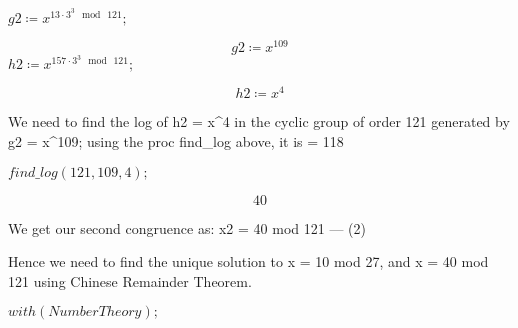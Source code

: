 \documentclass[11pt,a4paper,fleqn]{article}
\begin{document}
\begin{enumerate}[1.]
\begin{flushleft}
\begin{enumerate}
\begin{mdframed}
\begin{Maple Normal}
					\end{Maple Normal}
					\mapleinput
					{$ \displaystyle \mathit{g2} \coloneqq x^{13\cdot 3^{3}\mod \,121}; $}
					
					\begin{dmath}\label{(6)}
						\mathit{g2} \coloneqq x^{109}
					\end{dmath}
					\mapleinput
					{$ \displaystyle \mathit{h2} \coloneqq x^{157\cdot 3^{3}\mod \,121}; $}
					
					\begin{dmath}\label{(7)}
						\mathit{h2} \coloneqq x^{4}
					\end{dmath}
					\begin{Maple Normal}
						We need to find the log of h2 = x^4 in the cyclic group of order 121 generated by g2 = x^109; using the proc find\_log above, it is = 118
					\end{Maple Normal}
					\mapleinput
					{$ \displaystyle \textit{find\_log} (121,109,4); $}
					
					\begin{dmath}\label{(8)}
						40
					\end{dmath}
					\begin{Maple Normal}
						We get our second congruence as: x2 = 40 mod 121 --- (2)
					\end{Maple Normal}
					\begin{Maple Normal}
						
					\end{Maple Normal}
					\begin{Maple Normal}
						Hence  we need to find the unique solution to x = 10 mod 27, and x = 40 mod 121 using Chinese Remainder Theorem.
					\end{Maple Normal}
					\begin{Maple Normal}
						
					\end{Maple Normal}
					\mapleinput
					{$ \displaystyle \mathit{with} (\mathit{NumberTheory}); $}
					

\end{mdframed}
\end{enumerate}
\end{flushleft}
\end{enumerate}
\end{document}
